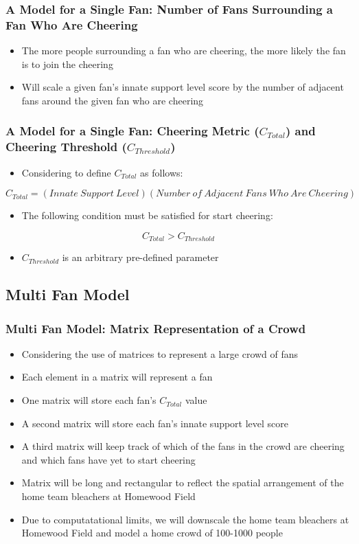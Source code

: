 \documentclass[compress,handout,10pt]{beamer}
\let\olditem\item
\renewcommand{\item}{\setlength{\itemsep}{0.5\baselineskip}\olditem}
\begin{document}
\begin {frame}
	\frametitle {A Model for a Single Fan: Number of Fans Surrounding a Fan Who Are Cheering}
		\begin{itemize}
			\item The more people surrounding a fan who are cheering, the more likely the fan is to join the cheering
			\item Will scale a given fan's innate support level score by the number of adjacent fans around the given fan who are cheering
		\end {itemize}
\end {frame}

\begin {frame}
	\frametitle {A Model for a Single Fan: Cheering Metric ($C_{Total}$) and Cheering Threshold ($C_{Threshold}$)}
	\begin{itemize}
		\item Considering to define $C_{Total}$ as follows: \newline
	\end {itemize}
	$$C_{Total} = (Innate\ Support\ Level)(Number\ of\ Adjacent\ Fans\ Who\ Are\ Cheering)$$
	\begin{itemize}
		\item The following condition must be satisfied for start cheering:\newline
	\end {itemize}	
	$$C_{Total}>C_{Threshold}$$
	\begin{itemize}
		\item $C_{Threshold}$ is an arbitrary pre-defined parameter
	\end {itemize}
\end {frame}


\subsection{Multi Fan Model}

\begin{frame}
\frametitle {Multi Fan Model: Matrix Representation of a Crowd}
	\begin {itemize}
		\item Considering the use of matrices to represent a large crowd of fans
		\item Each element in a matrix will represent a fan
		\item One matrix will store each fan's $C_{Total}$ value
		\item A second matrix will store each fan's innate support level score
		\item A third matrix will keep track of which of the fans in the crowd are cheering and which fans have yet to start cheering 
		\item Matrix will be long and rectangular to reflect the spatial arrangement of the home team bleachers at Homewood Field
		\item Due to computatational limits, we will downscale the home team bleachers at Homewood Field and model a home crowd of 100-1000 people
	\end{itemize}		
\end{frame}
\end{document}
